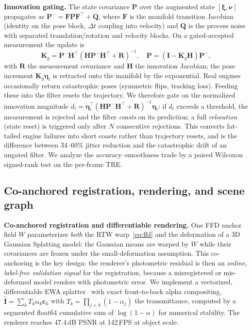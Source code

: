 \documentclass[9pt,twoside,web]{ieeecolor2}
\begin{document}
\textbf{Innovation gating.} The state covariance $\mathbf{P}$ over the augmented state $[\boldsymbol{\xi},\boldsymbol{\nu}]$ propagates as $\mathbf{P}^{-}=\mathbf{F}\mathbf{P}\mathbf{F}^{\top}+\mathbf{Q}$, where $\mathbf{F}$ is the manifold transition Jacobian (identity on the pose block, $\Delta t$ coupling into velocity) and $\mathbf{Q}$ is the process noise with separated translation/rotation and velocity blocks. On a gated-accepted measurement the update is
\begin{equation}\label{eq:kalmanupdate}
\mathbf{K}_{g}=\mathbf{P}^{-}\mathbf{H}^{\top}(\mathbf{H}\mathbf{P}^{-}\mathbf{H}^{\top}+\mathbf{R})^{-1},\quad
\mathbf{P}=(\mathbf{I}-\mathbf{K}_{g}\mathbf{H})\mathbf{P}^{-},
\end{equation}
with $\mathbf{R}$ the measurement covariance and $\mathbf{H}$ the innovation Jacobian; the pose increment $\mathbf{K}_{g}\boldsymbol{\eta}_{t}$ is retracted onto the manifold by the exponential. Real engines occasionally return catastrophic poses (symmetric flips, tracking loss). Feeding these into the filter resets the trajectory. We therefore gate on the normalized innovation magnitude $d_{t}=\boldsymbol{\eta}_{t}^{\top}(\mathbf{H}\mathbf{P}^{-}\mathbf{H}^{\top}+\mathbf{R})^{-1}\boldsymbol{\eta}_{t}$: if $d_{t}$ exceeds a threshold, the measurement is rejected and the filter \emph{coasts} on its prediction; a full \emph{relocation} (state reset) is triggered only after $N$ consecutive rejections. This converts fat-tailed engine failures into short coasts rather than trajectory resets, and is the difference between 34--60\% jitter reduction and the catastrophic drift of an ungated filter. We analyze the accuracy--smoothness trade by a paired Wilcoxon signed-rank test on the per-frame TRE.

\subsection{Co-anchored registration, rendering, and scene graph}\label{sec:render}

\textbf{Co-anchored registration and differentiable rendering.} One FFD anchor field $W$ parameterizes \emph{both} the RTW warp~\eqref{eq:ffd} and the deformation of a 3D Gaussian Splatting model: the Gaussian means are warped by $W$ while their covariances are frozen under the small-deformation assumption. This co-anchoring is the key design: the renderer's photometric residual is then an \emph{online, label-free validation signal} for the registration, because a misregistered or mis-deformed model renders with photometric error. We implement a vectorized, differentiable EWA splatter~\cite{kerbl20233dgs} with exact front-to-back alpha compositing, $\hat{\mathbf{I}}=\sum_{k}T_{k}\alpha_{k}\mathbf{c}_{k}$ with $T_{k}=\prod_{j<k}(1-\alpha_{j})$ the transmittance, computed by a segmented float64 cumulative sum of $\log(1-\alpha)$ for numerical stability. The renderer reaches 47.4\,dB PSNR at 142\,FPS at object scale.
\end{document}
